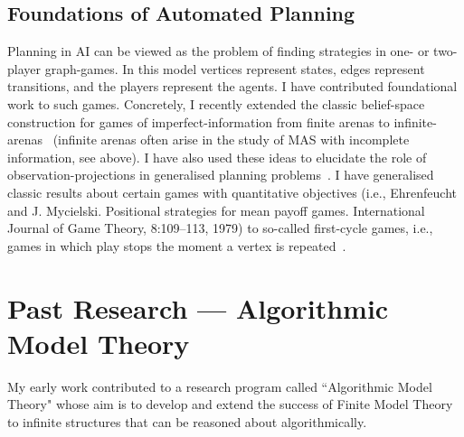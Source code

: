 \documentclass[10pt,a4paper,sans]{moderncv}
\begin{document}
 
\subsection{Foundations of Automated Planning}
Planning in AI can be viewed as the problem of finding strategies in one- or two-player graph-games. In this model vertices represent states, edges represent transitions, and the players represent the agents. I have contributed foundational work to such games. Concretely, I recently extended the classic belief-space construction for games of imperfect-information from finite arenas to infinite-arenas~\cite{GMRS16IJCAI} (infinite arenas often arise in the study of MAS with incomplete information, see above). I have also used these ideas to elucidate the role of observation-projections in generalised planning problems~\cite{BDGR17ICAPS,BDGR17}.
I have generalised classic results about certain games with quantitative objectives (i.e., Ehrenfeucht and J. Mycielski. Positional strategies for mean payoff games. International Journal of Game Theory, 8:109--113, 1979) to so-called first-cycle games, i.e., games in which play stops the moment a vertex is repeated~\cite{AR16}. 
\newline





\section{Past Research --- Algorithmic Model Theory}
My early work contributed to a research program called ``Algorithmic  Model Theory" whose aim is to develop and extend the success of Finite Model Theory to infinite structures that can be reasoned about algorithmically. 
\newline
\end{document}
